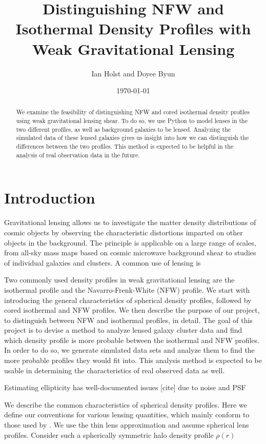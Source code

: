 \documentclass[10pt]{article}
\begin{document}
\title{Distinguishing NFW and Isothermal Density Profiles with Weak Gravitational Lensing}
\author{Ian Holst and Doyee Byun}
\date{\today}
\maketitle

\begin{abstract}
We examine the feasibility of distinguishing NFW and cored isothermal density profiles using weak gravitational lensing shear.
 To do so, we use Python to model lenses in the two different profiles, as well as background galaxies to be lensed.
 Analyzing the simulated data of these lensed galaxies gives us insight into how we can distinguish the differences between the two profiles.
 This method is expected to be helpful in the analysis of real observation data in the future.
\end{abstract}

\section{Introduction}
Gravitational lensing allows us to investigate the matter density distributions of cosmic objects by observing the characteristic distortions imparted on other objects in the background. The principle is applicable on a large range of scales, from all-sky mass maps based on cosmic microwave background shear to studies of individual galaxies and clusters.
A common use of lensing is

Two commonly used density profiles in weak gravitational lensing are the isothermal profile and the Navarro-Frenk-White (NFW) profile.
We start with introducing the general characteristics of spherical density profiles, followed by cored isothermal and NFW profiles.
We then describe the purpose of our project, to distinguish between NFW and isothermal profiles, in detail.
The goal of this project is to devise a method to analyze lensed galaxy cluster data and find which density profile is more probable between the isothermal and NFW profiles.
In order to do so, we generate simulated data sets and analyze them to find the more probable profiles they would fit into.
This analysis method is expected to be usable in determining the characteristics of real observed data as well.



Estimating ellipticity has well-documented issues [cite] due to noise and PSF


We describe the common characteristics of spherical density profiles.
Here we define our conventions for various lensing quantities, which mainly conform to those used by \citet{Dodelson2017}. We use the thin lens approximation and assume spherical lens profiles.
Consider such a spherically symmetric halo density profile $\rho(r)$
\end{document}
